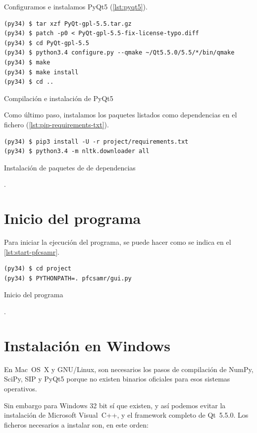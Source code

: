 \newpage
Configuramos e instalamos PyQt5 (\autoref{lst:pyqt5}).

\begin{listing}[htbp]
\begin{verbatim}
(py34) $ tar xzf PyQt-gpl-5.5.tar.gz
(py34) $ patch -p0 < PyQt-gpl-5.5-fix-license-typo.diff
(py34) $ cd PyQt-gpl-5.5
(py34) $ python3.4 configure.py --qmake ~/Qt5.5.0/5.5/*/bin/qmake
(py34) $ make
(py34) $ make install
(py34) $ cd ..
\end{verbatim}
\caption{Compilación e instalación de PyQt5}
\label{lst:pyqt5}
\end{listing}
\FloatBarrier

Como último paso, instalamos los paquetes listados como dependencias en el fichero  (\autoref{lst:pip-requirements-txt}).

\begin{listing}[htbp]
\begin{verbatim}
(py34) $ pip3 install -U -r project/requirements.txt
(py34) $ python3.4 -m nltk.downloader all
\end{verbatim}
\caption{Instalación de paquetes de  de dependencias}.
\label{lst:pip-requirements-txt}
\end{listing}
\FloatBarrier

\section{Inicio del programa}

Para iniciar la ejecución del programa, se puede hacer como se indica en el \autoref{lst:start-pfcsamr}.

\begin{listing}[htbp]
\begin{verbatim}
(py34) $ cd project
(py34) $ PYTHONPATH=. pfcsamr/gui.py
\end{verbatim}
\caption{Inicio del programa}.
\label{lst:start-pfcsamr}
\end{listing}
\FloatBarrier

\section{Instalación en Windows}

En Mac~OS~X y GNU/Linux, son necesarios los pasos de compilación de NumPy, SciPy, SIP y PyQt5 porque no existen binarios oficiales para esos sistemas operativos.

Sin embargo para Windows 32 bit sí que existen, y así podemos evitar la instalación de Microsoft Visual~C++, y el framework completo de Qt~5.5.0. Los ficheros necesarios a instalar son, en este orden:

